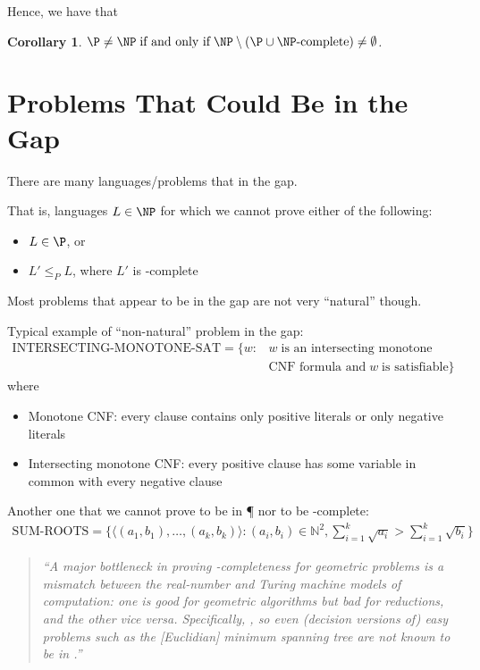 \documentclass[a4paper]{report}
\newtheorem{coro}{Corollary}
\theoremstyle{definition}
\begin{document}
Hence, we have that
\begin{coro}
$\P \neq \NP \;\text{if and only if}\; \NP \setminus (\P \cup \NP\text{-complete}) \neq \emptyset$.
\end{coro}

\section{Problems That Could Be in the Gap}
There are many languages/problems that  in the gap.

That is, languages $L \in \NP$ for which we cannot prove either of the following:
\begin{itemize}
\item $L \in \P$, or
\item $L' \leq_P L$, where $L'$ is \NP-complete
\end{itemize}

Most problems that appear to be in the gap are not very ``natural'' though.

Typical example of ``non-natural'' problem in the gap:
%
\begin{align*}
\text{INTERSECTING-MONOTONE-SAT} = \{ w : & \;w \;\text{is an intersecting monotone}\\ & \; \text{CNF formula and} \;w \; \text{is satisfiable} \}
\end{align*}
%
where
\begin{itemize}
\item Monotone CNF: every clause contains only positive literals or only negative literals
\item Intersecting monotone CNF: every positive clause has some variable in common with every negative clause
\end{itemize}

Another one that we cannot prove to be in \P{} nor to be \NP-complete:
%
\begin{align*}
\text{SUM-ROOTS} = \{ \langle (a_1,b_1), \dots{}, (a_k,b_k) \rangle : (a_i,b_i) \in \mathbb{N}^2, \sum_{i=1}^k\sqrt{a_i} > \sum_{i=1}^k\sqrt{b_i} \}
\end{align*}

\begin{quote}
{\em ``A major bottleneck in proving \NP-completeness for geometric problems is a mismatch between the real-number and Turing machine models of computation: one is good for geometric algorithms but bad for reductions, and the other vice versa. Specifically, , so even (decision versions of) easy problems such as the [Euclidian] minimum spanning tree are not known to be in \NP.''} \citep{eppstein-web}
\end{quote}
\end{document}
